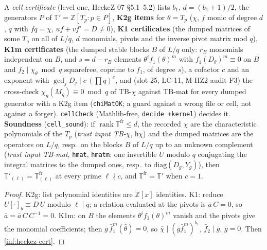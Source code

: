 \begin{definition}\label{chk:hz-k12}
  \leanok
  A \emph{cell certificate} (level one, HeckeZ 07 \S5.1--5.2) lists $b_1$, $d=(b_1+1)/2$, the generators $P$ of $\mathbb T'=\mathbb Z[T_p:p\in P]$,
  \textbf{K2g items} for $\theta=T_p$ ($\chi$, $f$ monic of degree $d$, $q$ with $fq=\chi$, $uf+vf'=D\ne0$), \textbf{K1 certificates}
  (the dumped matrices of some $T_g$ on all of $L/q$, $d$ monomials, pivots and the inverse pivot matrix mod $q$),
  \textbf{K1m certificates} (the dumped stable blocks $B$ of $L/q$ only: $r_B$ monomials independent on $B$, and $s=d-r_B$ elements
  $\theta^if_1(\theta)^m$ with $f_1(D_\theta)^m\equiv0$ on $B$ and $f_2\mid\chi_\theta\bmod q$ squarefree, coprime to $f_1$, of degree $s$),
  a cofactor $c$ and an exponent with $\gcd_jD_j\mid c\,(\prod q)^{e}$, and (slot 25, LC-11, M-HZ2 audit F3) the cross-check
  $\chi_g(M_g)\equiv0\bmod q$ of TB-$\chi$ against TB-mat for every dumped generator with a K2g item (\texttt{chiMatOK}; a guard against a
  wrong file or cell, not against a forger). \texttt{cellCheck} (Mathlib-free, \texttt{decide +kernel})
  decides it. \textbf{Soundness} (\texttt{cell\_sound}): if $\operatorname{rank}\mathbb T^{\mathrm{fr}}\le d$, the recorded $\chi$ are the
  characteristic polynomials of the $T_p$ (\emph{trust input TB-$\chi$}, \texttt{h$\chi$}) and the dumped matrices are the operators on
  $L/q$, resp.\ on the blocks $B$ of $L/q$ up to an unknown complement (\emph{trust input TB-mat}, \texttt{hmat}, \texttt{hmatm}: one
  invertible $U$ modulo $q$ conjugating the integral matrices to the dumped ones, resp.\ to $\mathrm{diag}(D_g,Y_g)$), then
  $\mathbb T'_{(\ell)}=\mathbb T^{\mathrm{fr}}_{(\ell)}$ at every prime $\ell\nmid c$, and $\mathbb T^{\mathrm{fr}}=\mathbb T'$ when $c=1$.
\end{definition}
\begin{proof}
  \leanok
  K2g: list polynomial identities are $\mathbb Z[x]$ identities. K1: reduce $U[\cdot]_b\equiv D\,U$ modulo $\ell\mid q$; a relation evaluated
  at the pivots is $\bar a\,C=0$, so $\bar a=\bar a\,C\,C^{-1}=0$. K1m: on $B$ the elements $\theta^if_1(\theta)^m$ vanish and the pivots
  give the monomial coefficients; then $\bar g\,\bar f_1^m(\bar\theta)=0$, so $\bar\chi\mid(\bar g\bar f_1^m)^{b_1}$, $\bar f_2\mid\bar g$, $\bar g=0$.
  Then \ref{inf:heckez-cert}.
\end{proof}

